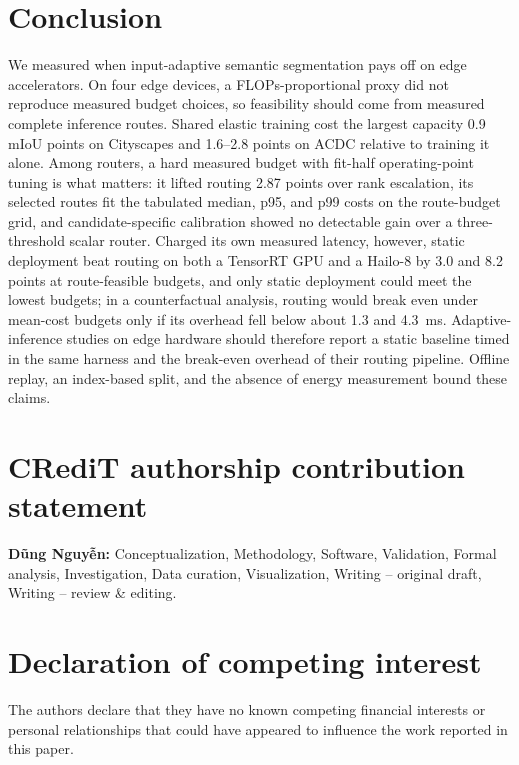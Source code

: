 \documentclass[a4paper,5p]{elsarticle}
\newcommand{\miou}{mIoU}
\begin{document}
\section{Conclusion}
\label{sec:conclusion}

We measured when input-adaptive semantic segmentation pays off on edge accelerators. On four edge devices, a FLOPs-proportional proxy did not reproduce measured budget choices, so feasibility should come from measured complete inference routes. Shared elastic training cost the largest capacity 0.9 \miou{} points on Cityscapes and 1.6--2.8 points on ACDC relative to training it alone. Among routers, a hard measured budget with fit-half operating-point tuning is what matters: it lifted routing 2.87 points over rank escalation, its selected routes fit the tabulated median, p95, and p99 costs on the route-budget grid, and candidate-specific calibration showed no detectable gain over a three-threshold scalar router. Charged its own measured latency, however, static deployment beat routing on both a TensorRT GPU and a Hailo-8 by 3.0 and 8.2 points at route-feasible budgets, and only static deployment could meet the lowest budgets; in a counterfactual analysis, routing would break even under mean-cost budgets only if its overhead fell below about 1.3 and 4.3~ms. Adaptive-inference studies on edge hardware should therefore report a static baseline timed in the same harness and the break-even overhead of their routing pipeline. Offline replay, an index-based split, and the absence of energy measurement bound these claims.

\section*{CRediT authorship contribution statement}

\textbf{D\~ung Nguy\~{\^e}n:} Conceptualization, Methodology, Software, Validation, Formal analysis, Investigation, Data curation, Visualization, Writing -- original draft, Writing -- review \& editing.

\section*{Declaration of competing interest}

The authors declare that they have no known competing financial interests or personal relationships that could have appeared to influence the work reported in this paper.
\end{document}
